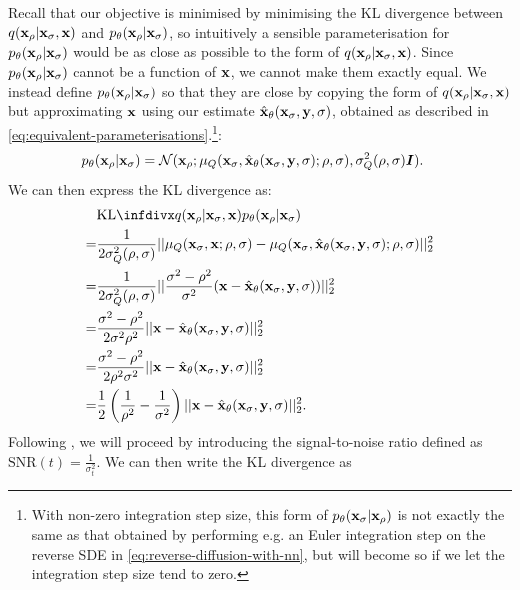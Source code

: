 Recall that our objective is minimised by minimising the KL divergence between $q({\mathbf{x}}_\rho|{\mathbf{x}}_\sigma,{\mathbf{x}})$ and $p_\theta({\mathbf{x}}_{\rho}|{\mathbf{x}}_{\sigma})$, so intuitively a sensible parameterisation for $p_\theta({\mathbf{x}}_\rho|{\mathbf{x}}_\sigma)$ would be as close as possible to the form of $q({\mathbf{x}}_\rho|{\mathbf{x}}_\sigma,{\mathbf{x}})$. Since $p_\theta({\mathbf{x}}_{\rho}|{\mathbf{x}}_{\sigma})$ cannot be a function of ${\mathbf{x}}$, we cannot make them exactly equal. We instead define $p_\theta({\mathbf{x}}_\rho|{\mathbf{x}}_\sigma)$ so that they are close by copying the form of $q({\mathbf{x}}_\rho|{\mathbf{x}}_\sigma,{\mathbf{x}})$ but approximating ${\mathbf{x}}$ using our estimate $\hat{{\mathbf{x}}}_\theta({\mathbf{x}}_\sigma, {\mathbf{y}}, \sigma)$, obtained as described in \cref{eq:equivalent-parameterisations}.\footnote{With non-zero integration step size, this form of $p_\theta({\mathbf{x}}_{\sigma} | {\mathbf{x}}_{\rho})$ is not exactly the same as that obtained by performing e.g. an Euler integration step on the reverse SDE in \cref{eq:reverse-diffusion-with-nn}, but will become so if we let the integration step size tend to zero.}:
\begin{align}
    p_\theta({\mathbf{x}}_{\rho} | {\mathbf{x}}_{\sigma}) &= {\mathcal{N}}( {\mathbf{x}}_{\rho}; \mathbf{\mu}_Q({\mathbf{x}}_\sigma, \hat{{\mathbf{x}}}_\theta({\mathbf{x}}_\sigma, {\mathbf{y}}, \sigma); \rho, \sigma), \sigma_Q^2(\rho, \sigma) {\bm{I}} ).
\end{align}
We can then express the KL divergence as:
\begin{align}
    &\kl{q(\rvx_{\rho} | \rvx_{\sigma}, \rvx)}{p_\theta(\rvx_{\rho} | \rvx_{\sigma})} \\ 
    = &\frac{1}{2 \sigma_Q^2(\rho, \sigma)} || \mathbf{\mu}_Q(\rvx_\sigma, \rvx; \rho, \sigma) - \mathbf{\mu}_Q(\rvx_\sigma, \hat{\rvx}_\theta(\rvx_\sigma, \rvy, \sigma); \rho, \sigma) ||_2^2 \\
    = &\frac{1}{2 \sigma_Q^2(\rho, \sigma)} || \frac{\sigma^2-\rho^2}{\sigma^2} ( \rvx - \hat{\rvx}_\theta(\rvx_\sigma, \rvy, \sigma) ) ||_2^2 \\
    = &\frac{\sigma^2-\rho^2}{2 \sigma^2 \rho^2} || \rvx - \hat{\rvx}_\theta(\rvx_\sigma, \rvy, \sigma) ||_2^2 \\
    = &\frac{\sigma^2 - \rho^2}{2 \rho^2 \sigma^2} || \rvx - \hat{\rvx}_\theta(\rvx_\sigma, \rvy, \sigma) ||_2^2 \\
    = &\frac{1}{2} \left( \frac{1}{\rho^2} - \frac{1}{\sigma^2} \right) || \rvx - \hat{\rvx}_\theta(\rvx_\sigma, \rvy, \sigma) ||_2^2.
\end{align}
Following \citet{kingma2021variational}, we will proceed by introducing the signal-to-noise ratio defined as $\text{SNR}(t) = \frac{1}{\sigma_t^2}$. We can then write the KL divergence as
